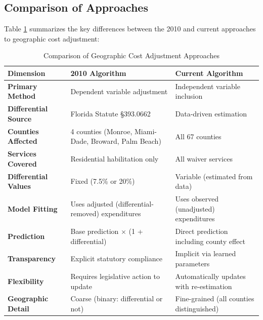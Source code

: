 \subsection{Comparison of Approaches}
\label{subsec:approach-comparison}

Table \ref{tab:geographic-approach-comparison} summarizes the key differences between the 2010 and current approaches to geographic cost adjustment:

\begin{table}[H]
\centering
\caption{Comparison of Geographic Cost Adjustment Approaches}
\small
\begin{tabular}{p{3.5cm}p{5cm}p{5cm}}
\toprule
\textbf{Dimension} & \textbf{2010 Algorithm} & \textbf{Current Algorithm} \\
\midrule
\textbf{Primary Method} & Dependent variable adjustment & Independent variable inclusion \\
\midrule
\textbf{Differential Source} & Florida Statute §393.0662 & Data-driven estimation \\
\midrule
\textbf{Counties Affected} & 4 counties (Monroe, Miami-Dade, Broward, Palm Beach) & All 67 counties \\
\midrule
\textbf{Services Covered} & Residential habilitation only & All waiver services \\
\midrule
\textbf{Differential Values} & Fixed (7.5\% or 20\%) & Variable (estimated from data) \\
\midrule
\textbf{Model Fitting} & Uses adjusted (differential-removed) expenditures & Uses observed (unadjusted) expenditures \\
\midrule
\textbf{Prediction} & Base prediction $\times$ (1 + differential) & Direct prediction including county effect \\
\midrule
\textbf{Transparency} & Explicit statutory compliance & Implicit via learned parameters \\
\midrule
\textbf{Flexibility} & Requires legislative action to update & Automatically updates with re-estimation \\
\midrule
\textbf{Geographic Detail} & Coarse (binary: differential or not) & Fine-grained (all counties distinguished) \\
\bottomrule
\end{tabular}
\label{tab:geographic-approach-comparison}
\end{table}

